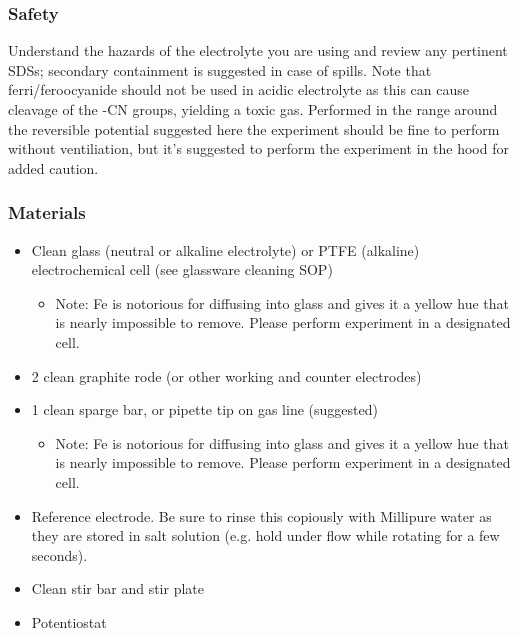 \documentclass{article}
\begin{document}
\subsubsection*{Safety}
Understand the hazards of the electrolyte you are using and review any pertinent SDSs; secondary containment is suggested in case of spills. Note that ferri/feroocyanide should not be used in acidic electrolyte as this can cause cleavage  of the -CN groups, yielding a toxic gas. Performed in the range around the reversible potential suggested here the experiment should be fine to perform without ventiliation, but it's suggested to perform the experiment in the hood for added caution.

\subsubsection*{Materials}
\begin{itemize}
  \item Clean glass (neutral or alkaline electrolyte) or PTFE (alkaline) electrochemical cell (see glassware cleaning SOP)
  \begin{itemize}
    \item Note: Fe is notorious for diffusing into glass and gives it a yellow hue that is nearly impossible to remove. Please perform experiment in a designated cell.
  \end{itemize}
  \item 2 clean graphite rode (or other working and counter electrodes)
  \item 1 clean sparge bar, or pipette tip on gas line (suggested)
  \begin{itemize}
    \item Note: Fe is notorious for diffusing into glass and gives it a yellow hue that is nearly impossible to remove. Please perform experiment in a designated cell.
  \end{itemize}
  \item Reference electrode. Be sure to rinse this copiously with Millipure water as they are stored in salt solution (e.g. hold under flow while rotating for a few seconds).
  \item Clean stir bar and stir plate
  \item Potentiostat
\end{itemize}
\end{document}
